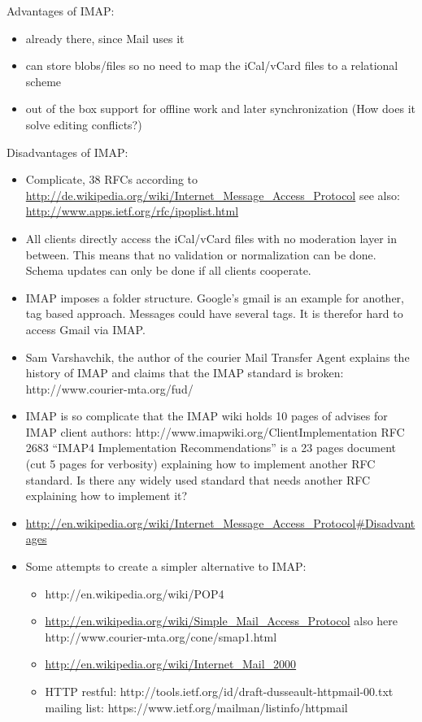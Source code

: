\documentclass[12pt,a4paper]{scrartcl}		%
\begin{document}
Advantages of IMAP:
\begin{itemize}
\item already there, since Mail uses it
\item can store blobs/files so no need to map the iCal/vCard files to a relational scheme
\item out of the box support for offline work and later synchronization (How does it solve editing conflicts?)
\end{itemize}
Disadvantages of IMAP:
\begin{itemize}
\item Complicate, 38 RFCs according to \url{http://de.wikipedia.org/wiki/Internet_Message_Access_Protocol} see also: \url{http://www.apps.ietf.org/rfc/ipoplist.html}
\item All clients directly access the iCal/vCard files with no moderation layer in between. This means that no validation or normalization can be done. Schema updates can only be done if all clients cooperate.
\item IMAP imposes a folder structure. Google's gmail is an example for another, tag based approach. Messages could have several tags. It is therefor hard to access Gmail via IMAP.
\item Sam Varshavchik, the author of the courier Mail Transfer Agent explains the history of IMAP and claims that the IMAP standard is broken: http://www.courier-mta.org/fud/
\item IMAP is so complicate that the IMAP wiki holds 10 pages of advises for IMAP client authors: http://www.imapwiki.org/ClientImplementation RFC 2683 ``IMAP4 Implementation Recommendations'' is a 23 pages document (cut 5 pages for verbosity) explaining how to implement another RFC standard. Is there any widely used standard that needs another RFC explaining how to implement it?
\item \url{http://en.wikipedia.org/wiki/Internet_Message_Access_Protocol#Disadvantages}
\item Some attempts to create a simpler alternative to IMAP:
  \begin{itemize}
  \item http://en.wikipedia.org/wiki/POP4
  \item \url{http://en.wikipedia.org/wiki/Simple_Mail_Access_Protocol} also here http://www.courier-mta.org/cone/smap1.html
  \item \url{http://en.wikipedia.org/wiki/Internet_Mail_2000}
  \item HTTP restful: http://tools.ietf.org/id/draft-dusseault-httpmail-00.txt mailing list: https://www.ietf.org/mailman/listinfo/httpmail

\end{itemize}
\end{itemize}
\end{document}
